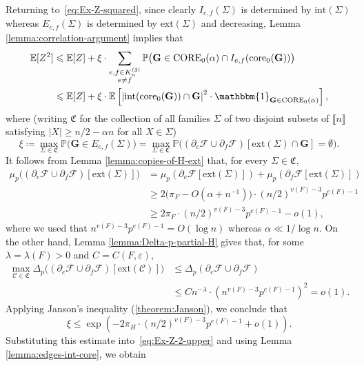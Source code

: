 \documentclass[11pt,a4paper,oneside,reqno]{amsart}
\newcommand{\bG}{\mathbf{G}}
\newcommand{\cC}{\mathcal{C}}
\newcommand{\cF}{\mathcal{F}}
\newcommand{\fC}{\mathfrak{C}}
\renewcommand{\Pr}{\mathbb{P}}
\newcommand{\Ex}{\mathbb{E}}
\newcommand{\1}{\mathbbm{1}} %
\newcommand{\eps}{\varepsilon}
\newcommand{\br}[1]{\llbracket{#1}\rrbracket}
\renewcommand{\le}{\leqslant}
\renewcommand{\ge}{\geqslant}
\newcommand{\ext}{\mathrm{ext}}
\renewcommand{\int}{\mathrm{int}}
\newcommand{\core}{\mathrm{core}}
\newcommand{\Core}{\mathrm{CORE}}
\begin{document}
Returning to~\eqref{eq:Ex-Z-squared}, since clearly $I_{e,f}(\Sigma)$ is determined by $\int(\Sigma)$ whereas $E_{e,f}(\Sigma)$ is determined by $\ext(\Sigma)$ and decreasing, Lemma \ref{lemma:correlation-argument} implies that
\begin{equation}
  \label{eq:Ex-Z-2-upper}
  \begin{split}
    \Ex[Z^2] & \le \Ex[Z] + \xi \cdot \sum_{\substack{e,f \in K_n^{(3)} \\ e \neq f}} \Pr\big(\bG \in \Core_{0}(\alpha) \cap I_{e,f}(\core_0(\bG))\big) \\
    & \le \Ex[Z] + \xi \cdot \Ex\left[\left|\int(\core_0(\bG)) \cap \bG\right|^2 \cdot \1_{\bG \in \Core_{0}(\alpha)}\right],
  \end{split}
\end{equation}
where (writing $\fC$ for the collection of all families $\Sigma$ of two disjoint subsets of $\br{n}$ satisfying $|X| \ge n/2 - \alpha n$ for all $X \in \Sigma$)
\[
  \xi \coloneqq 
  \max_{\Sigma \in \fC} \Pr\big(\bG \in E_{e,f}(\Sigma)\big)
  = \max_{\Sigma \in \fC} \Pr\big((\partial_e\cF \cup \partial_f\cF)[\ext(\Sigma) \cap \bG] = \emptyset\big).
\]
It follows from Lemma \ref{lemma:copies-of-H-ext} that, for every $\Sigma \in \fC$,
\[
  \begin{split}
    \mu_p\big((\partial_e \cF \cup \partial_f \cF)[\ext(\Sigma)]\big)
    & = \mu_p(\partial_e \cF[\ext(\Sigma)]) + \mu_p(\partial_f \cF[\ext(\Sigma)]) \\
    & \ge 2 \big(\pi_F - O(\alpha + n^{-1})\big) \cdot (n/2)^{v(F)-3} p^{e(F)-1} \\
    & \ge 2\pi_F \cdot (n/2)^{v(F)-3} p^{e(F)-1} - o(1),
  \end{split}
\]
where we used that $n^{v(F)-3} p^{e(F)-1} = O(\log n)$ whereas $\alpha \ll 1/\log n$.
On the other hand, Lemma \ref{lemma:Delta-p-partial-H} gives that, for some $\lambda = \lambda(F) > 0$ and $C = C(F, \eps)$,
\[
  \begin{split}
    \max_{\cC \in \fC} \Delta_p\big((\partial_e \cF \cup \partial_f \cF)[\ext(\cC)]\big)
    & \le \Delta_p(\partial_e \cF \cup \partial_f \cF) \\
    & \le Cn^{-\lambda} \cdot \left(n^{v(F)-3} p^{e(F)-1}\right)^2 = o(1).
  \end{split}
\]
Applying Janson's inequality (\ref{theorem:Janson}), we conclude that
\[
  \xi \le \exp\left(-2\pi_H \cdot (n/2)^{v(F)-3} p^{e(F)-1} + o(1)\right).
\]
Substituting this estimate into~\eqref{eq:Ex-Z-2-upper} and using Lemma \ref{lemma:edges-int-core}, we obtain
\end{document}
